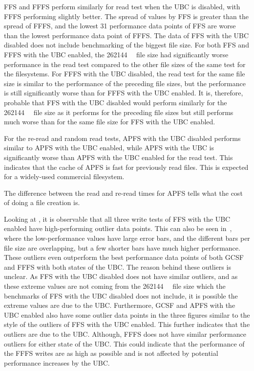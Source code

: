 \gls{FFS} and \gls{FFFS} perform similarly for read test when the \gls{UBC} is disabled, with \gls{FFFS} performing slightly better. The spread of values by \gls{FFS} is greater than the spread of \gls{FFFS}, and the lowest 31 performance data points of \gls{FFS} are worse than the lowest performance data point of \gls{FFFS}. The data of \gls{FFS} with the \gls{UBC} disabled does not include benchmarking of the biggest file size. For both \gls{FFS} and \gls{FFFS} with the \gls{UBC} enabled, the \SI{262144}{\kilo\byte} file size had significantly worse performance in the read test compared to the other file sizes of the same test for the filesystems. For \gls{FFFS} with the \gls{UBC} disabled, the read test for the same file size is similar to the performance of the preceding file sizes, but the performance is still significantly worse than for \gls{FFFS} with the \gls{UBC} enabled. It is, therefore, probable that \gls{FFS} with the \gls{UBC} disabled would perform similarly for the \SI{262144}{\kilo\byte} file size as it performs for the preceding file sizes but still performs much worse than for the same file size for \gls{FFS} with the \gls{UBC} enabled.

For the \mbox{re-read} and random read tests, \gls{APFS} with the \gls{UBC} disabled performs similar to \gls{APFS} with the \gls{UBC} enabled, while \gls{APFS} with the \gls{UBC} is significantly worse than \gls{APFS} with the \gls{UBC} enabled for the read test. This indicates that the cache of \gls{APFS} is fast for previously read files. This is expected for a \mbox{widely-used} commercial filesystem.

The difference between the read and re-read times for \gls{APFS} tells what the cost of doing a file creation is.

Looking at , it is observable that all three write tests of \gls{FFS} with the \gls{UBC} enabled have \mbox{high-performing} outlier data points. This can also be seen in~, where the low-performance values have large error bars, and the different bars per file size are overlapping, but a few shorter bars have much higher performance. These outliers even outperform the best performance data points of both \gls{GCSF} and \gls{FFFS} with both states of the \gls{UBC}. The reason behind these outliers is unclear. As \gls{FFS} with the \gls{UBC} disabled does not have similar outliers, and as these extreme values are not coming from the \SI{262144}{\kilo\byte} file size which the benchmarks of \gls{FFS} with the \gls{UBC} disabled does not include, it is possible the extreme values are due to the \gls{UBC}. Furthermore, \gls{GCSF} and \gls{APFS} with the \gls{UBC} enabled also have some outlier data points in the three figures similar to the style of the outliers of \gls{FFS} with the \gls{UBC} enabled. This further indicates that the outliers are due to the \gls{UBC}. Although, \gls{FFFS} does not have similar performance outliers for either state of the \gls{UBC}. This could indicate that the performance of the \gls{FFFS} writes are as high as possible and is not affected by potential performance increases by the \gls{UBC}.

